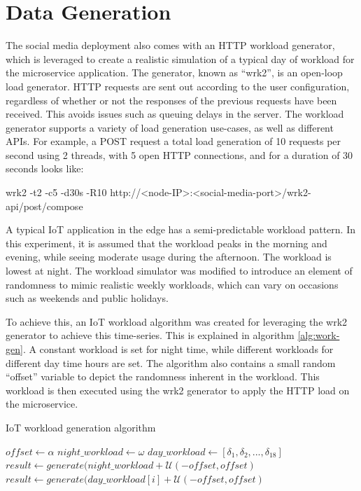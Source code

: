 \section{Data Generation}
\label{sec:data-generation}

The social media deployment also comes with an HTTP workload generator, which
is leveraged to create a realistic simulation of a typical day of workload for the microservice application. The generator, known as ``wrk2'', is an open-loop load generator. HTTP requests are sent out according to the user configuration, regardless of whether or not the responses of the previous requests have been received. This avoids issues such as queuing delays in the server. The workload generator supports a variety of load generation use-cases, as well as different APIs. For example, a POST request a total load generation of 10 requests per second using 2 threads, with 5 open HTTP connections, and for a duration of 30 seconds looks like:\par

wrk2 -t2 -c5 -d30s -R10 http://<node-IP>:<social-media-port>/wrk2-api/post/compose\par

A typical IoT application in the edge has a semi-predictable workload pattern. In this experiment, it is assumed that the workload peaks in the morning and evening, while seeing moderate usage during the afternoon. The workload is lowest at night. The workload simulator was modified to introduce an element of randomness to mimic realistic weekly workloads, which can vary on occasions such as weekends and public holidays.\par

To achieve this, an IoT workload algorithm was created for leveraging the wrk2 generator to achieve this time-series. This is explained in algorithm \ref{alg:work-gen}. A constant workload is set for night time, while different workloads for different day time hours are set. The algorithm also contains a small random ``offset'' variable to depict the randomness inherent in the workload. This workload is then executed using the wrk2 generator to apply the HTTP load on the microservice.

\begin{algorithm}
    \caption{IoT workload generation algorithm}
    \label{alg:work-gen}
    \begin{algorithmic}
        \State $offset \gets \alpha$
        \State $night\_workload \gets \omega$
        \State $day\_workload \gets [ \delta_1, \delta_2, ... , \delta_{18}]$
                \State $result \gets generate(night\_workload + \mathcal{U}(-offset,offset)$
            \EndFor
                \State $result \gets generate(day\_workload[i] + \mathcal{U}(-offset,offset)$
            \EndFor
        \EndWhile
    \end{algorithmic}
\end{algorithm}

